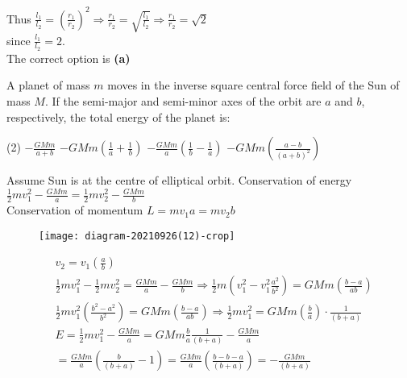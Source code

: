 \begin{enumerate}
\begin{answer}
	Thus $\frac{l_{1}}{l_{2}}=\left(\frac{r_{1}}{r_{2}}\right)^{2} \Rightarrow \frac{r_{1}}{r_{2}}=\sqrt{\frac{l_{1}}{l_{2}}} \Rightarrow \frac{r_{1}}{r_{2}}=\sqrt{2}$\\ since $\frac{l_{1}}{l_{2}}=2$.\\
	The correct option is \textbf{(a)}
\end{answer}
\begin{minipage}{\textwidth}
	\item A planet of mass $m$ moves in the inverse square central force field of the Sun of mass $M$. If the semi-major and semi-minor axes of the orbit are $a$ and $b$, respectively, the total energy of the planet is:
\end{minipage}
\begin{tasks}(2)
	\task[\textbf{A.}] $-\frac{G M m}{a+b}$
	\task[\textbf{B.}]$-G M m\left(\frac{1}{a}+\frac{1}{b}\right)$
	\task[\textbf{C.}]$-\frac{G M m}{a}\left(\frac{1}{b}-\frac{1}{a}\right)$
	\task[\textbf{D.}]$-G M m\left(\frac{a-b}{(a+b)^{2}}\right)$
\end{tasks}
\begin{answer}
 Assume Sun is at the centre of elliptical orbit. Conservation of energy\\
  $\frac{1}{2} m v_{1}^{2}-\frac{G M m}{a}=\frac{1}{2} m v_{2}^{2}-\frac{G M m}{b}$\\ Conservation of momentum $L=m v_{1} a=m v_{2} b$\\
  \begin{figure}[H]
  	\centering
  	\texttt{[image: diagram-20210926(12)-crop]}
  \end{figure}
 \begin{align*}
 	&v_{2}=v_{1}\left(\frac{a}{b}\right) \\
 	&\frac{1}{2} m v_{1}^{2}-\frac{1}{2} m v_{2}^{2}=\frac{G M m}{a}-\frac{G M m}{b} \Rightarrow \frac{1}{2} m\left(v_{1}^{2}-v_{1}^{2} \frac{a^{2}}{b^{2}}\right)=G M m\left(\frac{b-a}{a b}\right) \\
 	&\frac{1}{2} m v_{1}^{2}\left(\frac{b^{2}-a^{2}}{b^{2}}\right)=G M m\left(\frac{b-a}{a b}\right) \Rightarrow \frac{1}{2} m v_{1}^{2}=G M m\left(\frac{b}{a}\right) \cdot \frac{1}{(b+a)} \\
 	&E=\frac{1}{2} m v_{1}^{2}-\frac{G M m}{a}=G M m \frac{b}{a} \frac{1}{(b+a)}-\frac{G M m}{a} \\
 	&=\frac{G M m}{a}\left(\frac{b}{(b+a)}-1\right)=\frac{G M m}{a}\left(\frac{b-b-a}{(b+a)}\right)=-\frac{G M m}{(b+a)}
 \end{align*}

\end{answer}
\end{enumerate}
